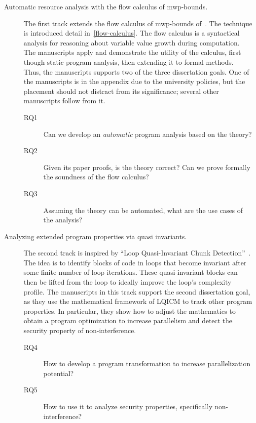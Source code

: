 \begin{description}
\item[Automatic resource analysis with the flow calculus of mwp-bounds.]
The first track extends the flow calculus of mwp-bounds of~\textcite{jones2009}.
The technique is introduced detail in~\autoref{flow-calculus}.
The flow calculus is a syntactical analysis for reasoning about variable value growth during computation.
The manuscripts apply and demonstrate the utility of the calculus, first though static program analysis, then extending it to formal methods.
Thus, the manuscripts supports two of the three dissertation goals.
One of the manuscripts is in the appendix due to the university policies, but the placement should not distract from its significance;
several other manuscripts follow from it.

\begin{description}
\item[RQ1] Can we develop an \emph{automatic} program analysis based on the theory?
\item[RQ2] Given its paper proofs, is the theory correct? Can we prove formally the soundness of the flow calculus?
\item[RQ3] Assuming the theory can be automated, what are the use cases of the analysis?
\end{description}

\item[Analyzing extended program properties via quasi invariants.]
The second track is inspired by \enquote{Loop Quasi-Invariant Chunk Detection}~\cite{moyen20172}.
The idea is to identify blocks of code in loops that become invariant after some finite number of loop iterations.
These quasi-invariant blocks can then be lifted from the loop to ideally improve the loop's complexity profile.
The manuscripts in this track support the second dissertation goal,
as they use the mathematical framework of LQICM to track other program properties.
In particular, they show how to adjust the mathematics to obtain a program optimization to increase parallelism and detect the security property of non-interference.

\begin{description}
\item[RQ4] How to develop a program transformation to increase parallelization potential?
\item[RQ5] How to use it to analyze security properties, specifically non-interference?
\end{description}


\end{description}
